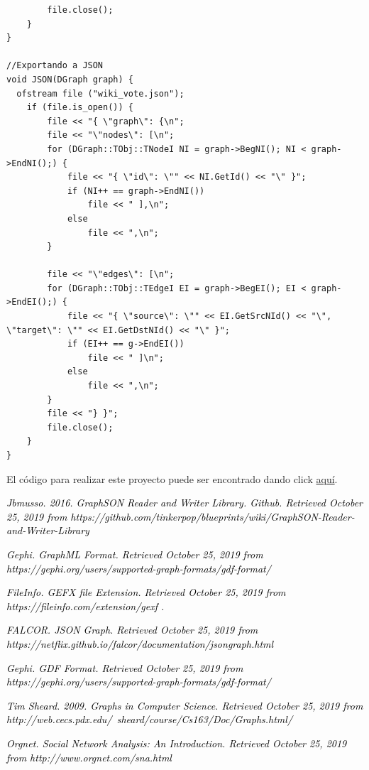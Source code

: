 \documentclass[12pt, letterpaper, twocolumn]{article}
\begin{document}
\begin{lstlisting}
		file.close();
	}
}

//Exportando a JSON
void JSON(DGraph graph) {
  ofstream file ("wiki_vote.json");
	if (file.is_open()) {
		file << "{ \"graph\": {\n";
		file << "\"nodes\": [\n";
		for (DGraph::TObj::TNodeI NI = graph->BegNI(); NI < graph->EndNI();) {
			file << "{ \"id\": \"" << NI.GetId() << "\" }";
			if (NI++ == graph->EndNI())
				file << " ],\n";
			else
				file << ",\n";
		}

		file << "\"edges\": [\n";
		for (DGraph::TObj::TEdgeI EI = graph->BegEI(); EI < graph->EndEI();) {
			file << "{ \"source\": \"" << EI.GetSrcNId() << "\", \"target\": \"" << EI.GetDstNId() << "\" }";
			if (EI++ == g->EndEI())
				file << " ]\n";
			else
				file << ",\n";
		}
		file << "} }";
		file.close();
	}
}
\end{lstlisting}

El código para realizar este proyecto puede ser encontrado dando click \href{https://github.com/tec-csf/tc2017-t4-otono-2019-dvigleo}{aquí}.

\begin{thebibliography}{7}
\textit{\textcolor{black}{\footnotesize{}Jbmusso. 2016. GraphSON Reader and Writer Library. Github. Retrieved October 25, 2019 from https://github.com/tinkerpop/blueprints/wiki/GraphSON-Reader-and-Writer-Library}}{\footnotesize \par}

\textit{\textcolor{black}{\footnotesize{}Gephi. GraphML Format. Retrieved October 25, 2019 from https://gephi.org/users/supported-graph-formats/gdf-format/}}{\footnotesize \par}

\textit{\textcolor{black}{\footnotesize{}FileInfo. GEFX file Extension. Retrieved October 25, 2019 from https://fileinfo.com/extension/gexf .}}{\footnotesize \par}

\textit{\textcolor{black}{\footnotesize{}FALCOR. JSON Graph. Retrieved October 25, 2019 from https://netflix.github.io/falcor/documentation/jsongraph.html}}{\footnotesize \par}

\textit{\textcolor{black}{\footnotesize{}Gephi. GDF Format. Retrieved October 25, 2019 from https://gephi.org/users/supported-graph-formats/gdf-format/}}{\footnotesize \par}

\textit{\textcolor{black}{\footnotesize{}Tim Sheard. 2009. Graphs in Computer Science. Retrieved October 25, 2019 from http://web.cecs.pdx.edu/~sheard/course/Cs163/Doc/Graphs.html/ }}{\footnotesize \par}

\textit{\textcolor{black}{\footnotesize{}Orgnet. Social Network Analysis: An Introduction. Retrieved October 25, 2019 from http://www.orgnet.com/sna.html}}{\footnotesize \par}
\end{thebibliography}
\end{document}
